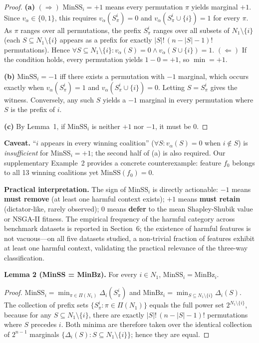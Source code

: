 \documentclass{article} %
\begin{document}
\begin{proof}
\textbf{(a)} $(\Rightarrow)$ $\text{MinSS}_i = +1$ means every permutation $\pi$ yields marginal $+1$. Since $v_\alpha \in \{0,1\}$, this requires $v_\alpha(S_\pi^i) = 0$ and $v_\alpha(S_\pi^i \cup \{i\}) = 1$ for every $\pi$. As $\pi$ ranges over all permutations, the prefix $S_\pi^i$ ranges over all subsets of $N_1 \setminus \{i\}$ (each $S \subseteq N_1 \setminus \{i\}$ appears as a prefix for exactly $|S|!\,(n-|S|-1)!$ permutations). Hence $\forall S \subseteq N_1\setminus\{i\}: v_\alpha(S)=0 \land v_\alpha(S\cup\{i\})=1$. $(\Leftarrow)$ If the condition holds, every permutation yields $1 - 0 = +1$, so $\min = +1$.

\textbf{(b)} $\text{MinSS}_i = -1$ iff there exists a permutation with $-1$ marginal, which occurs exactly when $v_\alpha(S_\pi^i) = 1$ and $v_\alpha(S_\pi^i \cup \{i\}) = 0$. Letting $S = S_\pi^i$ gives the witness. Conversely, any such $S$ yields a $-1$ marginal in every permutation where $S$ is the prefix of $i$.

\textbf{(c)} By Lemma~1, if $\text{MinSS}_i$ is neither $+1$ nor $-1$, it must be $0$.
\end{proof}

\textbf{Caveat.} ``$i$ appears in every winning coalition'' ($\forall S: v_\alpha(S)=0$ when $i\notin S$) is \emph{insufficient} for $\text{MinSS}_i=+1$; the second half of (a) is also required. Our supplementary Example~2 provides a concrete counterexample: feature $f_0$ belongs to all 13 winning coalitions yet $\text{MinSS}(f_0)=0$.

\textbf{Practical interpretation.} The sign of $\text{MinSS}_i$ is directly actionable: $-1$ means \textbf{must remove} (at least one harmful context exists); $+1$ means \textbf{must retain} (dictator-like, rarely observed); $0$ means \textbf{defer} to the mean Shapley-Shubik value or NSGA-II fitness. The empirical frequency of the harmful category across benchmark datasets is reported in Section~6; the existence of harmful features is not vacuous---on all five datasets studied, a non-trivial fraction of features exhibit at least one harmful context, validating the practical relevance of the three-way classification.

\textbf{Lemma 2 (MinSS = MinBz).}
For every $i \in N_1$, $\text{MinSS}_i = \text{MinBz}_i$.

\begin{proof}
$\text{MinSS}_i = \min_{\pi \in \Pi(N_1)} \Delta_i(S_\pi^i)$ and $\text{MinBz}_i = \min_{S \subseteq N_1 \setminus \{i\}} \Delta_i(S)$. The collection of prefix sets $\{S_\pi^i : \pi \in \Pi(N_1)\}$ equals the full power set $2^{N_1 \setminus \{i\}}$, because for any $S \subseteq N_1 \setminus \{i\}$, there are exactly $|S|!\,(n-|S|-1)!$ permutations where $S$ precedes $i$. Both minima are therefore taken over the identical collection of $2^{n-1}$ marginals $\{\Delta_i(S) : S \subseteq N_1 \setminus \{i\}\}$; hence they are equal.
\end{proof}
\end{document}
